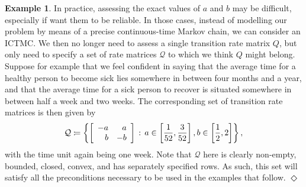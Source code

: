\documentclass[10pt,a4paper]{paper}
\theoremstyle{definition}
\newtheorem{exmp}{Example}%
\newcommand{\states}{\mathcal{X}}
\newcommand{\gambles}{\mathcal{L}}
\newcommand{\gamblesX}{\gambles(\states)}
\newcommand{\rateset}{\mathcal{Q}}
\newcommand{\lrate}{\underline{Q}}
\newcommand{\coloneqq}{:\!=}
\newcommand{\exampleend}{\hfill$\Diamond$}
\newcommand{\ictmc}{{ICTMC}}
\begin{document}
\begin{exmp}
In practice, assessing the exact values of $a$ and $b$ may be difficult, especially if want them to be reliable. In those cases, instead of modelling our problem by means of a precise continuous-time Markov chain, we can consider an \ictmc. We then no longer need to assess a single transition rate matrix $Q$, but only need to specify a set of rate matrices $\rateset$ to which we think $Q$ might belong. Suppose for example that we feel confident in saying that the average time for a healthy person to become sick lies somewhere in between four months and a year, and that the average time for a sick person to recover is situated somewhere in between half a week and two weeks. The corresponding set of transition rate matrices is then given by
\vspace{3pt}
\begin{equation}\label{eq:num_example_rateset_params}
\rateset \coloneqq \left\{\left[\begin{array}{rr}
-a & a \\
b & -b
\end{array}\right]\,:\,a\in\left[\frac{1}{52},\frac{3}{52}\right], b\in\left[\frac{1}{2},2\right]\right\},
\vspace{3pt}
\end{equation}
with the time unit again being one week. Note that $\rateset$ here is clearly non-empty, bounded, closed, convex, and has separately specified rows. As such, this set will satisfy all the preconditions necessary to be used in the examples that follow.
\exampleend
\end{exmp}

\end{document}
